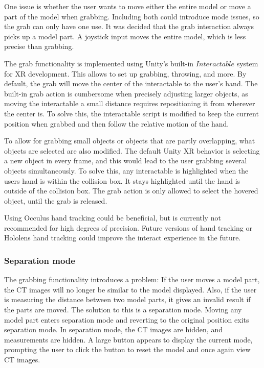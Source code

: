 \documentclass[a4paper]{report}
\begin{document}
One issue is whether the user wants to move either the entire model or move a part of the model when grabbing. Including both could introduce mode issues\cite{experience_modes_nodate}, so the grab can only have one use.
It was decided that the grab interaction always picks up a model part. A joystick input moves the entire model, which is less precise than grabbing.

The grab functionality is implemented using Unity's built-in $Interactable$ system for XR\cite{noauthor_xr_nodate} development. This allows to set up grabbing, throwing, and more. 
By default, the grab will move the center of the interactable to the user's hand. The built-in grab action is cumbersome when precisely adjusting larger objects, as moving the interactable a small distance requires repositioning it from wherever the center is. 
To solve this, the interactable script is modified to keep the current position when grabbed and then follow the relative motion of the hand.

To allow for grabbing small objects or objects that are partly overlapping, what objects are selected are also modified. The default Unity XR behavior is selecting a new object in every frame, and this would lead to the user grabbing several objects simultaneously. To solve this, any interactable is highlighted when the users hand is within the collision box. It stays highlighted until the hand is outside of the collision box. The grab action is only allowed to select the hovered object, until the grab is released.

Using Occulus hand tracking\cite{noauthor_set_nodate} could be beneficial, but is currently not recommended for high degrees of precision. Future versions of hand tracking or Hololens hand tracking could improve the interact experience in the future.


\subsubsection{Separation mode}
The grabbing functionality introduces a problem: If the user moves a model part, the CT images will no longer be similar to the model displayed. Also, if the user is measuring the distance between two model parts, it gives an invalid result if the parts are moved. 
The solution to this is a separation mode. Moving any model part enters separation mode and reverting to the original position exits separation mode. In separation mode, the CT images are hidden, and measurements are hidden. A large button appears to display the current mode, prompting the user to click the button to reset the model and once again view CT images.
\end{document}
